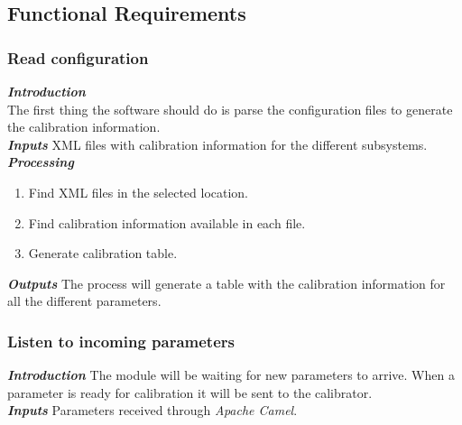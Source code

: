 \pagebreak

\subsection{Functional Requirements}

\subsubsection{Read configuration}

\textbf{\emph{Introduction}}\\
The first thing the software should do is parse the configuration files to generate the calibration information.\\

\textbf{\emph{Inputs}} \linebreak
XML files with calibration information for the different subsystems.\\

\textbf{\emph{Processing}}\linebreak
\begin{enumerate}
\item Find XML files in the selected location.
\item Find calibration information available in each file.
\item Generate calibration table.
\end{enumerate}
\vspace*{1\baselineskip}


\textbf{\emph{Outputs}}\linebreak
The process will generate a table with the calibration information for all the different parameters.\\




\subsubsection{Listen to incoming parameters}

\textbf{\emph{Introduction}}\linebreak
The module will be waiting for new parameters to arrive. When a parameter is ready for calibration it will be sent to the calibrator.\\

\textbf{\emph{Inputs}}\linebreak
Parameters received through \emph{Apache Camel}.\\

